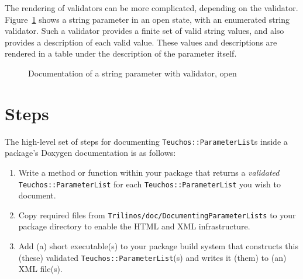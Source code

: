 \documentclass[pdf,ps2pdf,12pt]{smemo}
\begin{document}
\begin{memo}
The rendering of validators can be more complicated, depending on the
validator.  Figure~\ref{fig:open_string} shows a string parameter in
an open state, with an enumerated string validator. Such a validator
provides a finite set of valid string values, and also provides a
description of each valid value.  These values and descriptions are
rendered in a table under the description of the parameter itself.

\begin{figure}[b]
  \begin{centering}
    \caption{\label{fig:open_string} Documentation of a string
      parameter with validator, open}
  \end{centering}
\end{figure}

\section{Steps}
\label{sec:steps}

The high-level set of steps for documenting
\texttt{Teuchos::ParameterList}s inside a package's Doxygen
documentation is as follows:

\begin{enumerate}

\item Write a method or function within your package that returns a
  \emph{validated} \texttt{Teuchos::Pa\-ra\-me\-ter\-List} for each
  \texttt{Teuchos::ParameterList} you wish to document.

\item Copy required files from
  \texttt{Trilinos/doc/DocumentingParameterLists} to your package
  directory to enable the HTML and XML infrastructure.

\item Add (a) short executable(s) to your package build system that
  constructs this (these) validated \texttt{Teuchos::ParameterList}(s)
  and writes it (them) to (an) XML file(s).


\end{enumerate}
\end{memo}
\end{document}
